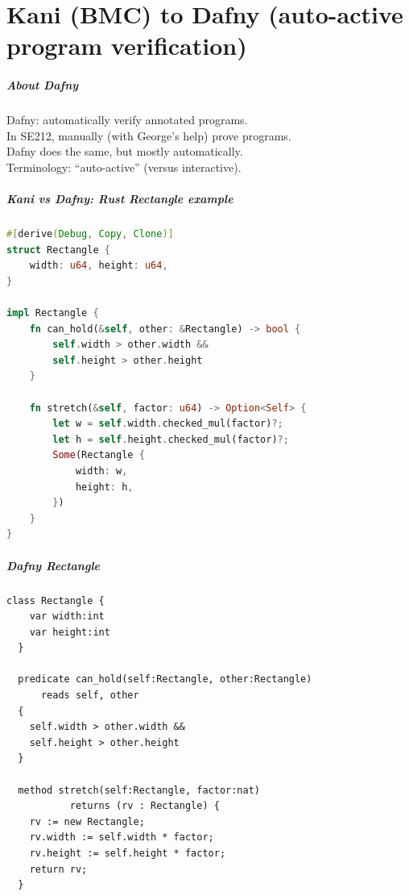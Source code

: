 \documentclass{beamer}
\newenvironment{changemargin}[1]{%
  \begin{list}{}{%
    \setlength{\topsep}{0pt}%
    \setlength{\leftmargin}{#1}%
    \setlength{\rightmargin}{1em}
    \setlength{\listparindent}{\parindent}%
    \setlength{\itemindent}{\parindent}%
    \setlength{\parsep}{\parskip}%
  }%
  \item[]}{\end{list}}
\begin{document}
\part{Kani (BMC) to Dafny (auto-active program verification)}
\begin{frame}
  \partpage
\end{frame}

\begin{frame}
  \frametitle{About Dafny}

  \Large
  \begin{changemargin}{1cm}
    Dafny: automatically verify annotated programs.\\[1em]
    In SE212, manually (with George's help) prove programs.\\[1em]
    Dafny does the same, but mostly automatically.\\[1em]
    Terminology: ``auto-active'' (versus interactive).
  \end{changemargin}
\end{frame}

\begin{frame}[fragile]
  \frametitle{Kani vs Dafny: Rust Rectangle example}
\small
\begin{lstlisting}[language=Rust]
#[derive(Debug, Copy, Clone)]
struct Rectangle {
    width: u64, height: u64,
}

impl Rectangle {
    fn can_hold(&self, other: &Rectangle) -> bool {
        self.width > other.width && 
        self.height > other.height 
    }

    fn stretch(&self, factor: u64) -> Option<Self> {
        let w = self.width.checked_mul(factor)?;
        let h = self.height.checked_mul(factor)?;
        Some(Rectangle {
            width: w,
            height: h,
        })
    }
}
\end{lstlisting}
\end{frame}
\begin{frame}[fragile]
  \frametitle{Dafny Rectangle}
\large
\begin{lstlisting}[language=dafny,basicstyle=\small]
  class Rectangle {
    var width:int
    var height:int
  }

  predicate can_hold(self:Rectangle, other:Rectangle)
      reads self, other
  {
    self.width > other.width &&
    self.height > other.height
  }

  method stretch(self:Rectangle, factor:nat)
           returns (rv : Rectangle) {
    rv := new Rectangle;
    rv.width := self.width * factor;
    rv.height := self.height * factor;
    return rv;
  }
\end{lstlisting}
\end{frame}
\end{document}
